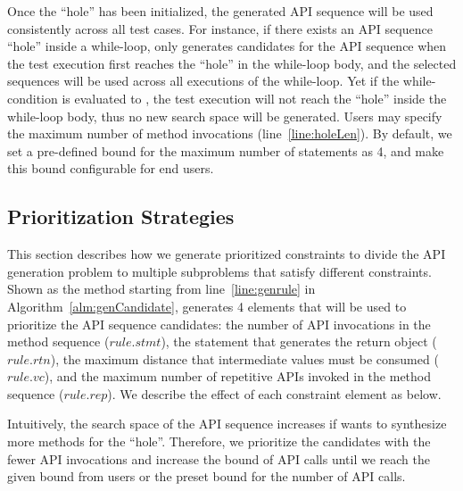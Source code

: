  Once the ``hole'' has been initialized, the generated API sequence will be used consistently across all test cases. For instance, if there exists an API sequence ``hole'' inside a while-loop, \tool only generates candidates for the API sequence when the test execution first reaches the ``hole'' in the while-loop body, and the selected  sequences will be used across all executions of the while-loop. Yet if the while-condition is evaluated to , the test execution will not reach the ``hole'' inside the while-loop body, thus no new search space will be generated.  Users may specify the maximum number of method invocations (line~\ref{line:holeLen}). By default, we set a pre-defined bound for the maximum number of statements as 4, and make this bound configurable for end users. 



 
\subsection{Prioritization Strategies}\label{sec:prioritize}

This section describes how we generate prioritized constraints to divide the API generation problem to multiple subproblems that satisfy different constraints. Shown as 
the method  starting from line~\ref{line:genrule} in Algorithm~\ref{alm:genCandidate}, \tool generates 4 elements that will be used to prioritize the API sequence candidates: the number of API invocations in the method sequence ($rule.stmt$),  the statement that generates the return object ($rule.rtn$), the maximum distance that intermediate values must be consumed ($rule.vc$), and the maximum number of repetitive APIs invoked in the method sequence ($rule.rep$).  We describe the effect of each constraint element as below. 

   Intuitively, the search space of the API sequence increases if \tool wants to synthesize more methods for the ``hole''.  Therefore, we prioritize the candidates with the fewer API invocations and increase the bound of API calls  until we reach the given bound from users or the preset bound for the number of API calls.  %

